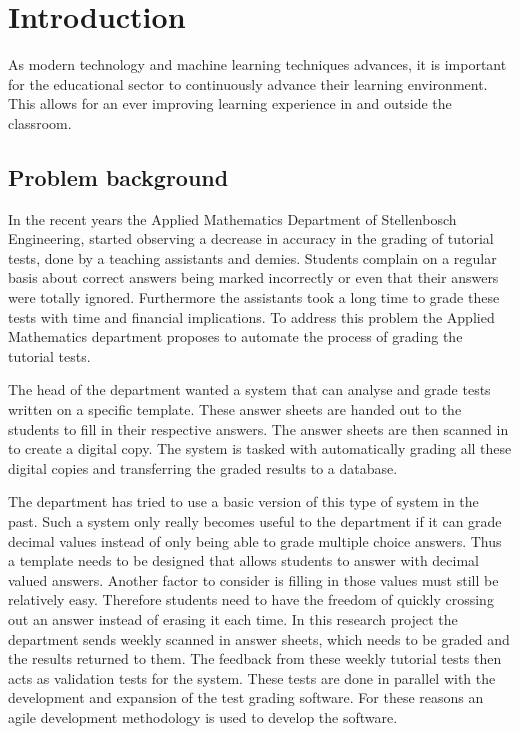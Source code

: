 \chapter{Introduction}
\label{ch:Introduction}
\graphicspath{{Chapter1/Chapter1Figures/}}
As modern technology and machine learning techniques advances, it is important for the educational sector to continuously advance their learning environment. This allows for an ever improving learning experience in and outside the classroom. 

\section{Problem background}

In the recent years the Applied Mathematics Department of Stellenbosch Engineering, started observing a decrease in accuracy in the grading of tutorial tests, done by a teaching assistants and demies.  Students complain on a regular basis about correct answers being marked incorrectly or even that their answers were totally ignored. Furthermore the assistants took a long time to grade these tests with time and financial implications. To address this problem the Applied Mathematics department proposes to automate the process of grading the tutorial tests.

The head of the department wanted a system that can analyse and grade tests written on a specific template. These answer sheets are handed out to the students to fill in their respective answers. The answer sheets are then scanned in to create a digital copy. The system is tasked with automatically grading all these digital copies and transferring the graded results to a database.

The department has tried to use a basic version of this type of system in the past. Such a system only really becomes useful to the department if it can grade decimal values instead of only being able to grade multiple choice answers. Thus a template needs to be designed that allows students to answer with decimal valued answers. Another factor to consider is filling in those values must still be relatively easy. Therefore students need to have the freedom of quickly crossing out an answer instead of erasing it each time.
In this research project the department sends weekly scanned in answer sheets, which needs to be graded and the results returned to them. The feedback from these weekly tutorial tests then acts as validation tests for the system. These tests are done in parallel with the development and expansion of the test grading software. For these reasons an agile development methodology is used to develop the software.

